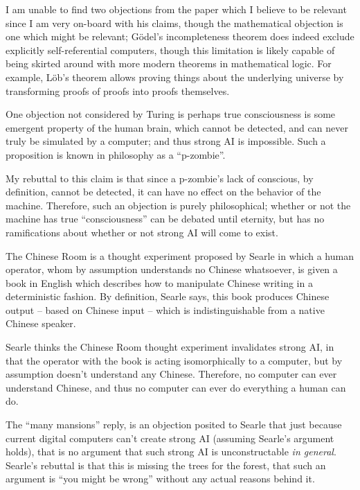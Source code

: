 \documentclass[12pt]{article}
\begin{document}
\problemsub
I am unable to find two objections from the paper which I believe to be relevant since I am very on-board with his
claims, though the mathematical objection is one which might be relevant; G\"odel's incompleteness theorem does indeed exclude
explicitly self-referential computers, though this limitation is likely capable of being skirted around with more modern
theorems in mathematical logic. For example, L\"ob's theorem allows proving things about the underlying universe by
transforming proofs of proofs into proofs themselves.

\problemsub
One objection not considered by Turing is perhaps true consciousness is some emergent property of the human brain, which
cannot be detected, and can never truly be simulated by a computer; and thus strong AI is impossible. Such a proposition
is known in philosophy as a ``p-zombie''.

My rebuttal to this claim is that since a p-zombie's lack of conscious, by definition, cannot be detected, it can have
no effect on the behavior of the machine. Therefore, such an objection is purely philosophical; whether or not the
machine has true ``consciousness'' can be debated until eternity, but has no ramifications about whether or not strong
AI will come to exist.

\newpage

\problemsub
The Chinese Room is a thought experiment proposed by Searle in which a human operator, whom by assumption understands no
Chinese whatsoever, is given a book in English which describes how to manipulate Chinese writing in a deterministic
fashion. By definition, Searle says, this book produces Chinese output -- based on Chinese input -- which is
indistinguishable from a native Chinese speaker.

\problemsub
Searle thinks the Chinese Room thought experiment invalidates strong AI, in that the operator with the book is acting
isomorphically to a computer, but by assumption doesn't understand any Chinese. Therefore, no computer can ever
understand Chinese, and thus no computer can ever do everything a human can do.

\problemsub
The ``many mansions'' reply, is an objection posited to Searle that just because current digital computers can't create
strong AI (assuming Searle's argument holds), that is no argument that such strong AI is unconstructable \textit{in
general}. Searle's rebuttal is that this is missing the trees for the forest, that such an argument is ``you might be
wrong'' without any actual reasons behind it.
\end{document}
